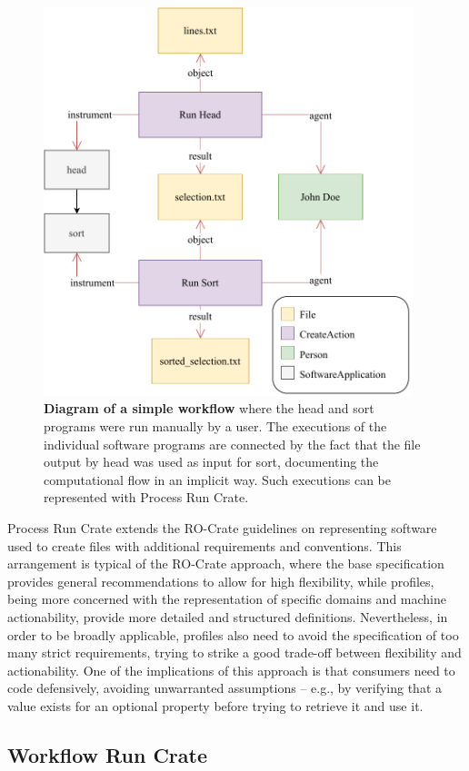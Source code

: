 \documentclass[10pt,letterpaper]{article}
\begin{document}
\begin{figure}[!ht]
\includegraphics[width=29em]{wrroc-figure-example.drawio.pdf}
\caption{{\bf Diagram of a simple workflow} where the head and sort programs were run manually by a user.
The executions of the individual software programs are connected by the fact that the file output by head was used as input for sort, documenting the computational flow in an implicit way.
Such executions can be represented with Process Run Crate.}
\label{fig:head_sort}
\end{figure}


Process Run Crate extends the RO-Crate guidelines on representing software used to create files with additional requirements and conventions.
This arrangement is typical of the RO-Crate approach, where the base specification provides general recommendations to allow for high flexibility, while profiles, being more concerned with the representation of specific domains and machine actionability, provide more detailed and structured definitions.
Nevertheless, in order to be broadly applicable, profiles also need to avoid the specification of too many strict requirements, trying to strike a good trade-off between flexibility and actionability.
One of the implications of this approach is that consumers need to code defensively, avoiding unwarranted assumptions – e.g., by verifying that a value exists for an optional property before trying to retrieve it and use it.


\subsection{Workflow Run Crate}\label{workflow-run-crate}
\end{document}

